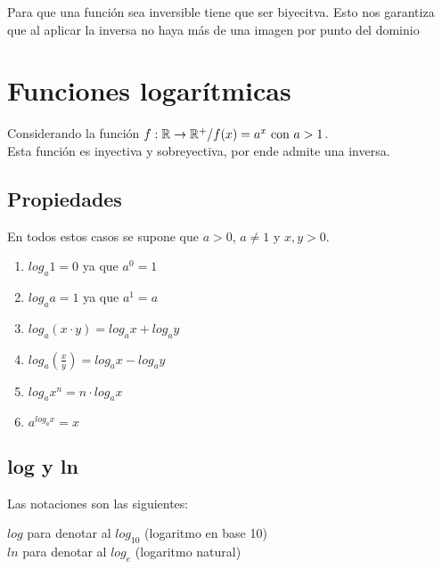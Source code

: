 Para que una función sea inversible tiene que ser biyecitva. Esto nos garantiza que al aplicar la inversa no haya más de una imagen por punto del dominio



\section{Funciones logarítmicas}
Considerando la función $f : {\mathbb{R}} \rightarrow {\mathbb{R}}^+ / f(x) = a^x \text{ con } a > 1$. \\
Esta función es inyectiva y sobreyectiva, por ende admite una inversa.

\subsection{Propiedades}
En todos estos casos se supone que $a > 0$, $a \neq 1$ y $x, y > 0$.
\begin{enumerate}
    \item $log_a 1 = 0$ ya que $a^0 = 1$
    \item $log_a a = 1$ ya que $a^1 = a$
    \item $log_a(x \cdot y) = log_a x + log_a y$
    \item $log_a \left(\frac{x}{y}\right) = log_a x - log_a y$
    \item $log_a x^n = n \cdot log_a x$
    \item $a^{log_a x} = x$
\end{enumerate}


\subsection{log y ln}
Las notaciones son las siguientes:
\begin{center}
    $log$ para denotar al $log_10$ (logaritmo en base 10)\\
    $ln$ para denotar al $log_e$ (logaritmo natural)
\end{center}

